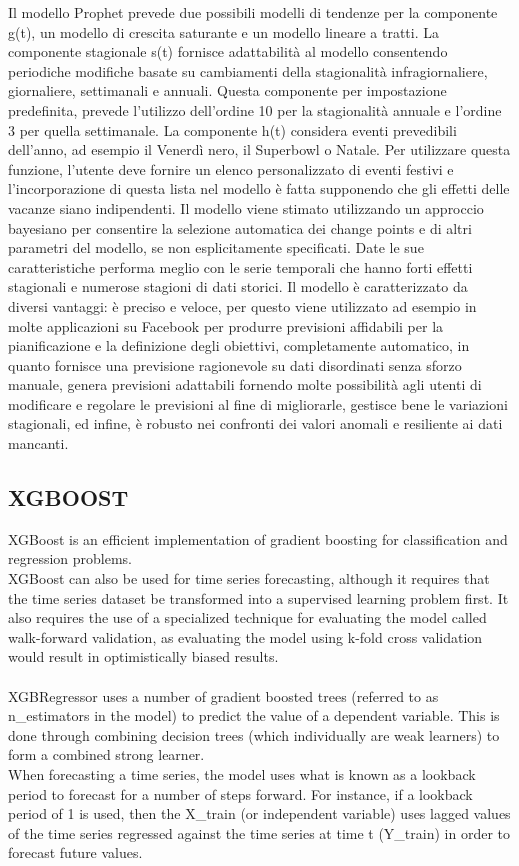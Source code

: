 \documentclass[12pt, a4paper, twocolumn]{article} %
\begin{document}
Il modello Prophet prevede due possibili modelli di tendenze per la componente g(t), un modello di crescita saturante e un modello lineare a tratti. La componente stagionale s(t) fornisce adattabilità al modello consentendo periodiche modifiche basate su cambiamenti della stagionalità infragiornaliere, giornaliere, settimanali e annuali. Questa componente per impostazione predefinita, prevede l'utilizzo dell’ordine 10 per la stagionalità annuale e l'ordine 3 per quella settimanale. La componente h(t) considera eventi prevedibili dell'anno, ad esempio  il Venerdì nero, il Superbowl o Natale. Per utilizzare questa funzione, l'utente deve fornire un elenco personalizzato di eventi festivi e l’incorporazione di questa lista nel modello è fatta supponendo che gli effetti delle vacanze siano indipendenti. Il modello viene stimato utilizzando un approccio bayesiano per consentire la selezione automatica dei change points e di altri parametri del modello, se non esplicitamente specificati. Date le sue caratteristiche performa meglio con le serie temporali che hanno forti effetti stagionali e numerose stagioni di dati storici. Il modello è caratterizzato da diversi vantaggi: è preciso e veloce, per questo viene utilizzato ad esempio in molte applicazioni su Facebook per produrre previsioni affidabili per la pianificazione e la definizione degli obiettivi, completamente automatico, in quanto fornisce una previsione ragionevole su dati disordinati senza sforzo manuale, genera previsioni adattabili fornendo molte possibilità agli utenti di modificare e regolare le previsioni al fine di migliorarle, gestisce bene le variazioni stagionali, ed infine, è robusto nei confronti dei valori anomali e resiliente ai dati mancanti.\\

\subsection{XGBOOST}
XGBoost is an efficient implementation of gradient boosting for classification and regression problems.\\
XGBoost can also be used for time series forecasting, although it requires that the time series dataset be transformed into a supervised learning problem first. It also requires the use of a specialized technique for evaluating the model called walk-forward validation, as evaluating the model using k-fold cross validation would result in optimistically biased results.\\
\\
XGBRegressor uses a number of gradient boosted trees (referred to as n\_estimators in the model) to predict the value of a dependent variable. This is done through combining decision trees (which individually are weak learners) to form a combined strong learner.\\
When forecasting a time series, the model uses what is known as a lookback period to forecast for a number of steps forward. For instance, if a lookback period of 1 is used, then the X\_train (or independent variable) uses lagged values of the time series regressed against the time series at time t (Y\_train) in order to forecast future values.\\
\cite{xgboost}
\end{document}
